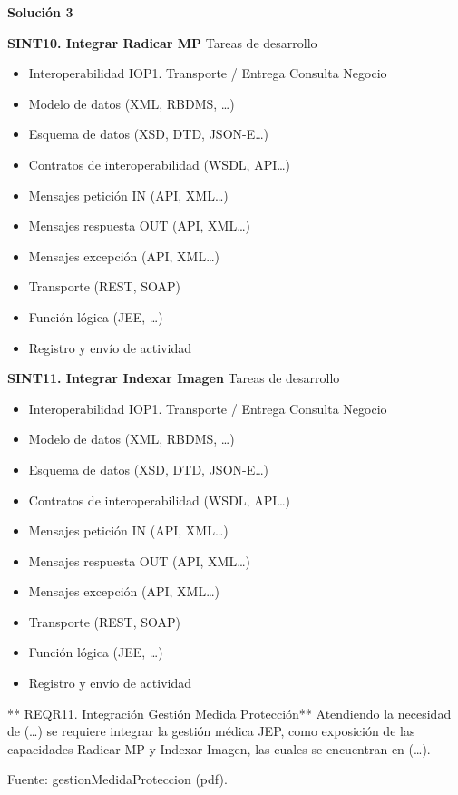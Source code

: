\documentclass[
  paper=a4,
  ,captions=tableheading
]{scrartcl}
\providecommand{\tightlist}{%
  \setlength{\itemsep}{0pt}\setlength{\parskip}{0pt}}
\begin{document}
\textbf{Solución 3}

\textbf{SINT10. Integrar Radicar MP} Tareas de desarrollo

\begin{itemize}
\tightlist
\item
  Interoperabilidad IOP1. Transporte / Entrega Consulta Negocio
\item
  Modelo de datos (XML, RBDMS, \ldots)
\item
  Esquema de datos (XSD, DTD, JSON-E\ldots)
\item
  Contratos de interoperabilidad (WSDL, API\ldots)
\item
  Mensajes petición IN (API, XML\ldots)
\item
  Mensajes respuesta OUT (API, XML\ldots)
\item
  Mensajes excepción (API, XML\ldots)
\item
  Transporte (REST, SOAP)
\item
  Función lógica (JEE, \ldots)
\item
  Registro y envío de actividad
\end{itemize}

\textbf{SINT11. Integrar Indexar Imagen} Tareas de desarrollo

\begin{itemize}
\tightlist
\item
  Interoperabilidad IOP1. Transporte / Entrega Consulta Negocio
\item
  Modelo de datos (XML, RBDMS, \ldots)
\item
  Esquema de datos (XSD, DTD, JSON-E\ldots)
\item
  Contratos de interoperabilidad (WSDL, API\ldots)
\item
  Mensajes petición IN (API, XML\ldots)
\item
  Mensajes respuesta OUT (API, XML\ldots)
\item
  Mensajes excepción (API, XML\ldots)
\item
  Transporte (REST, SOAP)
\item
  Función lógica (JEE, \ldots)
\item
  Registro y envío de actividad
\end{itemize}

** REQR11. Integración Gestión Medida Protección** Atendiendo la
necesidad de (\ldots) se requiere integrar la gestión médica JEP, como
exposición de las capacidades Radicar MP y Indexar Imagen, las cuales se
encuentran en (\ldots).

Fuente: gestionMedidaProteccion (pdf).
\end{document}
